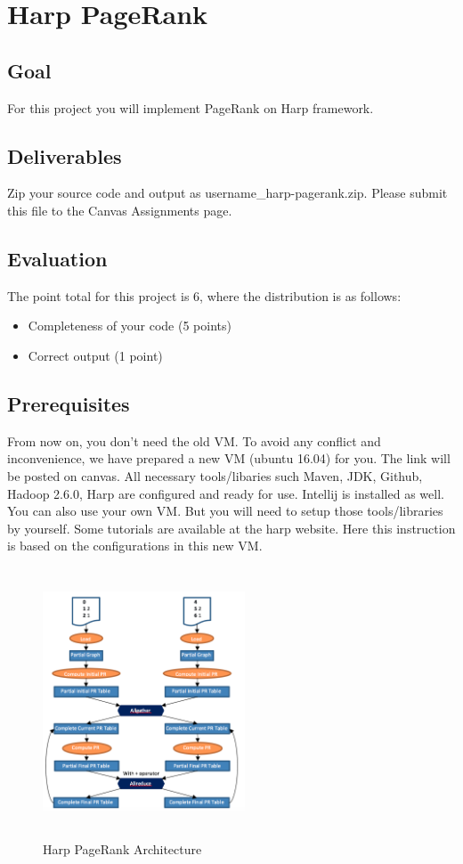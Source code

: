 \section*{Harp PageRank}
\subsection*{Goal}
For this project you will implement PageRank on Harp framework.

\subsection*{Deliverables}
Zip your source code and output as username\_harp-pagerank.zip. Please submit
this file to the Canvas Assignments page.

\subsection*{Evaluation}
The point total for this project is 6, where the distribution is as follows:
\begin{itemize}
\item Completeness of your code (5 points)
\item Correct output (1 point)
\end{itemize}

\subsection*{Prerequisites}
From now on, you don't need the old VM. To avoid any conflict and
inconvenience, we have prepared a new VM (ubuntu 16.04) for you. The link will
be posted on canvas. All necessary tools/libaries such Maven, JDK, Github,
Hadoop 2.6.0, Harp are configured and ready for use. Intellij is installed as
well. You can also use your own VM. But you will need to setup those
tools/libraries by yourself. Some tutorials are available at the harp
website. Here this instruction is based on the configurations in
this new VM.

\begin{figure}[!htbp]
\includegraphics[width=6cm,height=8cm]{section/icloud/assignment/problems/project7/p8}
\centering
\caption{Harp PageRank Architecture}
\end{figure}

